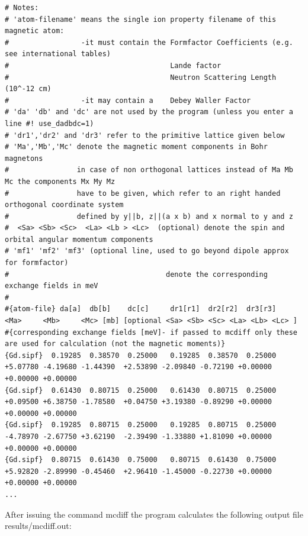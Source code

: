 {\begin{verbatim}
# Notes:
# 'atom-filename' means the single ion property filename of this magnetic atom:
#                 -it must contain the Formfactor Coefficients (e.g. see international tables)
#                                      Lande factor
#                                      Neutron Scattering Length (10^-12 cm) 
#                 -it may contain a    Debey Waller Factor
# 'da' 'db' and 'dc' are not used by the program (unless you enter a line #! use_dadbdc=1)
# 'dr1','dr2' and 'dr3' refer to the primitive lattice given below
# 'Ma','Mb','Mc' denote the magnetic moment components in Bohr magnetons
#                in case of non orthogonal lattices instead of Ma Mb Mc the components Mx My Mz
#                have to be given, which refer to an right handed orthogonal coordinate system 
#                defined by y||b, z||(a x b) and x normal to y and z
#  <Sa> <Sb> <Sc>  <La> <Lb > <Lc>  (optional) denote the spin and orbital angular momentum components 
# 'mf1' 'mf2' 'mf3' (optional line, used to go beyond dipole approx for formfactor)
#                                     denote the corresponding exchange fields in meV
#
#{atom-file} da[a]  db[b]    dc[c]     dr1[r1]  dr2[r2]  dr3[r3]   <Ma>     <Mb>     <Mc> [mb] [optional <Sa> <Sb> <Sc> <La> <Lb> <Lc> ]
#{corresponding exchange fields [meV]- if passed to mcdiff only these are used for calculation (not the magnetic moments)}
{Gd.sipf}  0.19285  0.38570  0.25000   0.19285  0.38570  0.25000   +5.07780 -4.19680 -1.44390  +2.53890 -2.09840 -0.72190 +0.00000 +0.00000 +0.00000
{Gd.sipf}  0.61430  0.80715  0.25000   0.61430  0.80715  0.25000   +0.09500 +6.38750 -1.78580  +0.04750 +3.19380 -0.89290 +0.00000 +0.00000 +0.00000
{Gd.sipf}  0.19285  0.80715  0.25000   0.19285  0.80715  0.25000   -4.78970 -2.67750 +3.62190  -2.39490 -1.33880 +1.81090 +0.00000 +0.00000 +0.00000
{Gd.sipf}  0.80715  0.61430  0.75000   0.80715  0.61430  0.75000   +5.92820 -2.89990 -0.45460  +2.96410 -1.45000 -0.22730 +0.00000 +0.00000 +0.00000
...
\end{verbatim}
}

After issuing the command {\prg mcdiff} 
the program calculates the following output file {\prg results/mcdiff.out}:

